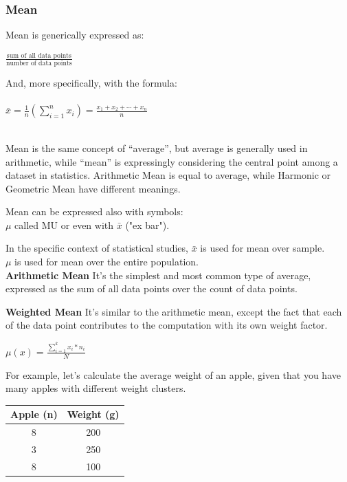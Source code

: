 \documentclass{article}
\begin{document}
\subsubsection{Mean}
Mean is generically expressed as:

$\frac{\text{sum of all data points}}{\text{number of data points}}$

And, more specifically, with the formula:\\
\mbox{} \\

${\displaystyle {\bar{x}}={\frac{1}{n}}\left(\sum _{i=1}^{n}{x_{i}}\right)={\frac{x_{1}+x_{2}+\cdots +x_{n}}{n}}}$

\mbox{} \\

Mean is the same concept of “average”, but average is generally used in arithmetic, while “mean” is expressingly considering the central point among a dataset in statistics. Arithmetic Mean is equal to average, while Harmonic or Geometric Mean have different meanings. 

Mean can be expressed also with symbols:\\
$\mu$ called MU or even with $\bar{x}$ ("ex bar").

In the specific context of statistical studies, 
$\bar{x}$ is used for mean over sample.\\
$\mu$ is used for mean over the entire population.\\

\textbf{Arithmetic Mean}
It's the simplest and most common type of  average, expressed as the sum of all data points over the count of data points.

\textbf{Weighted Mean}
It's similar to the arithmetic mean, except the fact that each of the data point contributes to the computation with its own weight factor.

$ \displaystyle \mu(x) = \frac{\sum \limits ^{k} _{i=1} x_i * n_i}{N}$

For example, let's calculate the average weight of an apple, given that you have many apples with different weight clusters.

\begin{center}
\begin{tabular}{|c|c|}
\hline
Apple (n) & Weight (g) \\ \hline
8 & 200 \\ 
3 & 250 \\ 
8 & 100 \\
\hline
\end{tabular}
\end{center}
\end{document}
